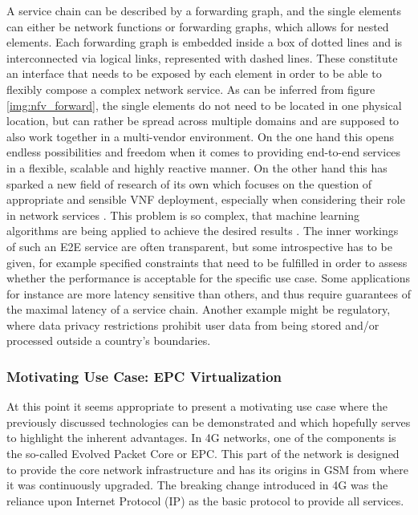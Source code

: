 A service chain can be described by a forwarding graph, and the single elements can either be network functions or forwarding graphs, which allows for nested elements. Each forwarding graph is embedded inside a box of dotted lines and is interconnected via logical links, represented with dashed lines. These constitute an interface that needs to be exposed by each element in order to be able to flexibly compose a complex network service. As can be inferred from figure \ref{img:nfv_forward}, the single elements do not need to be located in one physical location, but can rather be spread across multiple domains and are supposed to also work together in a multi-vendor environment. On the one hand this opens endless possibilities and freedom when it comes to providing end-to-end services in a flexible, scalable and highly reactive manner. On the other hand this has sparked a new field of research of its own which focuses on the question of appropriate and sensible VNF deployment, especially when considering their role in network services \cite{place1} \cite{place2} \cite{place3}. This problem is so complex, that machine learning algorithms are being applied to achieve the desired results \cite{placeml1} \cite{placeml2}.  The inner workings of such an E2E service are often transparent, but some introspective has to be given, for example specified constraints that need to be fulfilled in order to assess whether the performance is acceptable for the specific use case. Some applications for instance are more latency sensitive than others, and thus require guarantees of the maximal latency of a service chain. Another example might be regulatory, where data privacy restrictions prohibit user data from being stored and/or processed outside a country's boundaries. 


\subsubsection{Motivating Use Case: EPC Virtualization}
At this point it seems appropriate to present a motivating use case where the previously discussed technologies can be demonstrated and which hopefully serves to highlight the inherent advantages. In 4G networks, one of the components is the so-called Evolved Packet Core or EPC. This part of the network is designed to provide the core network infrastructure and has its origins in GSM from where it was continuously upgraded. The breaking change introduced in 4G was the reliance upon Internet Protocol (IP) as the basic protocol to provide all services. 

